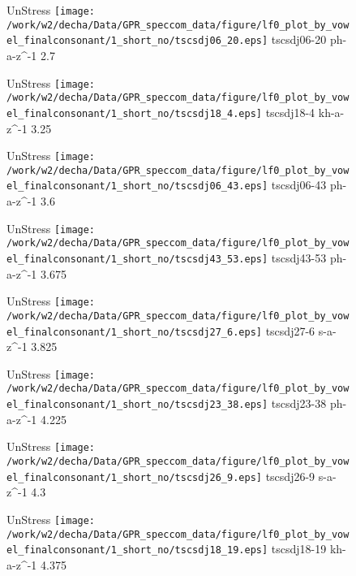 \documentclass{article}
\begin{document}
\begin{figure}[t]
\begin{minipage}[b]{.24\textwidth}
UnStress
\centering
\texttt{[image: /work/w2/decha/Data/GPR\_speccom\_data/figure/lf0\_plot\_by\_vowel\_finalconsonant/1\_short\_no/tscsdj06\_20.eps]}
tscsdj06-20 ph-a-z\textasciicircum-1 2.7
\end{minipage}
\begin{minipage}[b]{.24\textwidth}
UnStress
\centering
\texttt{[image: /work/w2/decha/Data/GPR\_speccom\_data/figure/lf0\_plot\_by\_vowel\_finalconsonant/1\_short\_no/tscsdj18\_4.eps]}
tscsdj18-4 kh-a-z\textasciicircum-1 3.25
\end{minipage}
\begin{minipage}[b]{.24\textwidth}
UnStress
\centering
\texttt{[image: /work/w2/decha/Data/GPR\_speccom\_data/figure/lf0\_plot\_by\_vowel\_finalconsonant/1\_short\_no/tscsdj06\_43.eps]}
tscsdj06-43 ph-a-z\textasciicircum-1 3.6
\end{minipage}
\begin{minipage}[b]{.24\textwidth}
UnStress
\centering
\texttt{[image: /work/w2/decha/Data/GPR\_speccom\_data/figure/lf0\_plot\_by\_vowel\_finalconsonant/1\_short\_no/tscsdj43\_53.eps]}
tscsdj43-53 ph-a-z\textasciicircum-1 3.675
\end{minipage}
\end{figure}

\begin{figure}[t]
\begin{minipage}[b]{.24\textwidth}
UnStress
\centering
\texttt{[image: /work/w2/decha/Data/GPR\_speccom\_data/figure/lf0\_plot\_by\_vowel\_finalconsonant/1\_short\_no/tscsdj27\_6.eps]}
tscsdj27-6 s-a-z\textasciicircum-1 3.825
\end{minipage}
\begin{minipage}[b]{.24\textwidth}
UnStress
\centering
\texttt{[image: /work/w2/decha/Data/GPR\_speccom\_data/figure/lf0\_plot\_by\_vowel\_finalconsonant/1\_short\_no/tscsdj23\_38.eps]}
tscsdj23-38 ph-a-z\textasciicircum-1 4.225
\end{minipage}
\begin{minipage}[b]{.24\textwidth}
UnStress
\centering
\texttt{[image: /work/w2/decha/Data/GPR\_speccom\_data/figure/lf0\_plot\_by\_vowel\_finalconsonant/1\_short\_no/tscsdj26\_9.eps]}
tscsdj26-9 s-a-z\textasciicircum-1 4.3
\end{minipage}
\begin{minipage}[b]{.24\textwidth}
UnStress
\centering
\texttt{[image: /work/w2/decha/Data/GPR\_speccom\_data/figure/lf0\_plot\_by\_vowel\_finalconsonant/1\_short\_no/tscsdj18\_19.eps]}
tscsdj18-19 kh-a-z\textasciicircum-1 4.375
\end{minipage}
\end{figure}
\end{document}
